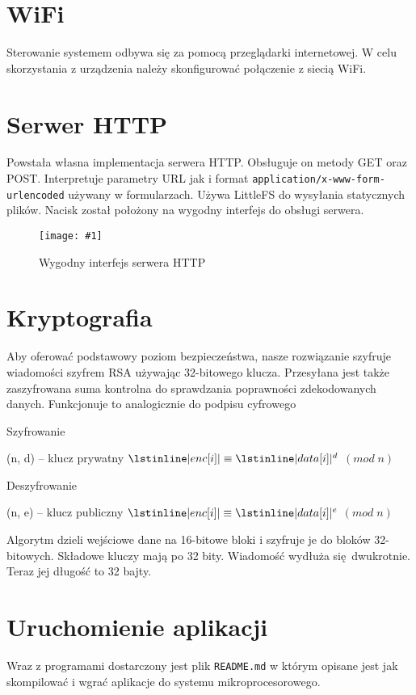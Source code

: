 \documentclass[12pt]{article}
\newcommand{\imgcustomsize}[3]{
	\begin{figure}[H]
		\centering
		\texttt{[image: \#1]}
		\caption{#2}
	\end{figure}
}
\newcommand{\img}[2]{\imgcustomsize{#1}{#2}{0.8}}
\begin{document}
	 \section{WiFi}
        Sterowanie systemem odbywa się za pomocą przeglądarki internetowej. W celu skorzystania z urządzenia należy skonfigurować połączenie z siecią WiFi.


	 \section{Serwer HTTP}
	 	Powstała własna implementacja serwera HTTP. Obsługuje on metody GET oraz POST. Interpretuje parametry URL jak i format \lstinline|application/x-www-form-urlencoded| używany w formularzach. Używa LittleFS do wysyłania statycznych plików. Nacisk został położony na wygodny interfejs do obsługi serwera.
	 	\img{pgm/http_init}{Wygodny interfejs serwera HTTP}

	 \section{Kryptografia}
	 	Aby oferować podstawowy poziom bezpieczeństwa, nasze rozwiązanie szyfruje wiadomości szyfrem RSA używając 32-bitowego klucza. Przesyłana jest także zaszyfrowana suma kontrolna do sprawdzania poprawności zdekodowanych danych. Funkcjonuje to analogicznie do podpisu cyfrowego

		\begin{algorithm}[H]
			\caption{Szyfrowanie}
			\begin{algorithmic}[1]
				\State (n, d) -- klucz prywatny
				\State $\lstinline|enc[i]| \equiv \lstinline|data[i]|^d$ $(mod \; n)$
				\EndFor
				\EndFunction
			\end{algorithmic}
		\end{algorithm}
		
		\begin{algorithm}[H]
			\caption{Deszyfrowanie}
			\begin{algorithmic}[1]
				\State (n, e) -- klucz publiczny
				\State $\lstinline|enc[i]| \equiv \lstinline|data[i]|^e$ $(mod \; n)$
				\EndFor
				\EndFunction
			\end{algorithmic}
		\end{algorithm}
		
	 	Algorytm dzieli wejściowe dane na 16-bitowe bloki i szyfruje je do bloków 32-bitowych. Składowe kluczy mają po 32 bity. Wiadomość wydłuża się dwukrotnie. Teraz jej długość to 32 bajty.
	 	
	 \section{Uruchomienie aplikacji}
	 	Wraz z programami dostarczony jest plik \lstinline|README.md| w którym opisane jest jak skompilować i wgrać aplikacje do systemu mikroprocesorowego.

	 
\end{document}
